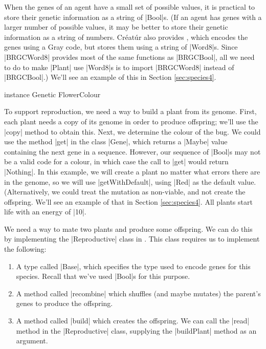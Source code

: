 When the genes of an agent have a small set of possible values,
it is practical to store their genetic information as a string of |Bool|s.
(If an agent has genes with a larger number of possible values,
it may be better to store their genetic information as a string of numbers.
Créatúr also provides ,
which encodes the genes using a Gray code, but stores them using a string of |Word8|s.
Since |BRGCWord8| provides most of the same functions as |BRGCBool|,
all we need to do to make |Plant| use |Word8|s is to import |BRGCWord8|
instead of |BRGCBool|.)
We'll see an example of this in Section \ref{sec:species4}.

\begin{code}
instance Genetic FlowerColour
\end{code} 

To support reproduction, we need a way to build a plant from its genome.
First, each plant needs a copy of its genome in order to produce offspring;
we'll use the |copy| method to obtain this.
Next, we determine the colour of the bug.
We could use the method |get| in the class |Gene|, 
which returns a |Maybe| value containing the next gene in a sequence.
However, our sequence of |Bool|s may not
be a valid code for a colour, in which case the call to |get|
would return |Nothing|.
In this example, we will create a plant no matter what errors there are in 
the genome, so we will use |getWithDefault|, using |Red| as the default value.
(Alternatively, we could treat the mutation as non-viable,
and not create the offspring.
We'll see an example of that in Section \ref{sec:species4}.
All plants start life with an energy of |10|.
        

We need a way to mate two plants and produce some offspring.
We can do this by implementing the |Reproductive| class in 
.
This class requires us to implement the following:
\begin{enumerate}
\item A type called |Base|, which specifies the type used to encode
genes for this species. Recall that we've used |Bool|s for this purpose.
\item A method called |recombine| which shuffles (and maybe mutates) the
 parent's genes to produce the offspring.
\item A method called |build| which creates the offspring.
We can call the |read| method in the |Reproductive| class,
supplying the |buildPlant| method as an argument.
\end {enumerate}

